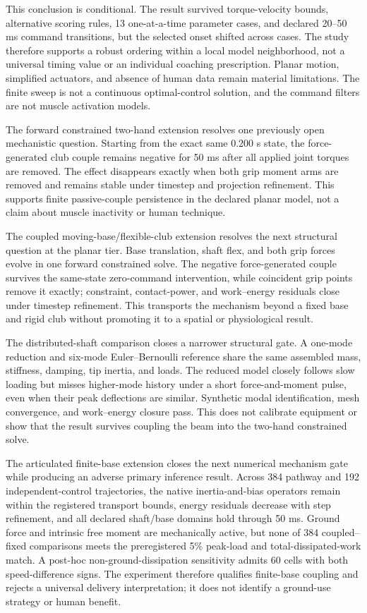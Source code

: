 \documentclass[
  letterpaper,
]{report}
\begin{document}
This conclusion is conditional. The result survived torque-velocity
bounds, alternative scoring rules, 13 one-at-a-time parameter cases, and
declared 20--50 ms command transitions, but the selected onset shifted
across cases. The study therefore supports a robust ordering within a
local model neighborhood, not a universal timing value or an individual
coaching prescription. Planar motion, simplified actuators, and absence
of human data remain material limitations. The finite sweep is not a
continuous optimal-control solution, and the command filters are not
muscle activation models.

The forward constrained two-hand extension resolves one previously open
mechanistic question. Starting from the exact same 0.200 s state, the
force-generated club couple remains negative for 50 ms after all applied
joint torques are removed. The effect disappears exactly when both grip
moment arms are removed and remains stable under timestep and projection
refinement. This supports finite passive-couple persistence in the
declared planar model, not a claim about muscle inactivity or human
technique.

The coupled moving-base/flexible-club extension resolves the next
structural question at the planar tier. Base translation, shaft flex,
and both grip forces evolve in one forward constrained solve. The
negative force-generated couple survives the same-state zero-command
intervention, while coincident grip points remove it exactly;
constraint, contact-power, and work--energy residuals close under
timestep refinement. This transports the mechanism beyond a fixed base
and rigid club without promoting it to a spatial or physiological
result.

The distributed-shaft comparison closes a narrower structural gate. A
one-mode reduction and six-mode Euler--Bernoulli reference share the
same assembled mass, stiffness, damping, tip inertia, and loads. The
reduced model closely follows slow loading but misses higher-mode
history under a short force-and-moment pulse, even when their peak
deflections are similar. Synthetic modal identification, mesh
convergence, and work--energy closure pass. This does not calibrate
equipment or show that the result survives coupling the beam into the
two-hand constrained solve.

The articulated finite-base extension closes the next numerical
mechanism gate while producing an adverse primary inference result.
Across 384 pathway and 192 independent-control trajectories, the native
inertia-and-bias operators remain within the registered transport
bounds, energy residuals decrease with step refinement, and all declared
shaft/base domains hold through 50 ms. Ground force and intrinsic free
moment are mechanically active, but none of 384 coupled--fixed
comparisons meets the preregistered 5\% peak-load and
total-dissipated-work match. A post-hoc non-ground-dissipation
sensitivity admits 60 cells with both speed-difference signs. The
experiment therefore qualifies finite-base coupling and rejects a
universal delivery interpretation; it does not identify a ground-use
strategy or human benefit.
\end{document}
